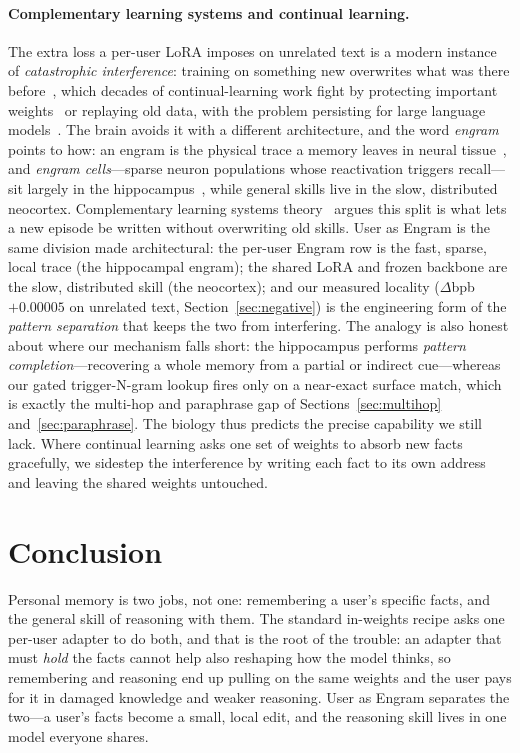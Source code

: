 \documentclass[11pt]{article}
\begin{document}
\paragraph{Complementary learning systems and continual learning.}
The extra loss a per-user LoRA imposes on unrelated text is a modern
instance of \emph{catastrophic interference}: training on
something new overwrites what was there
before~\citep{mccloskey1989catastrophic}, which decades of
continual-learning work fight by protecting important
weights~\citep{kirkpatrick2017ewc} or replaying old data, with
the problem persisting for large language
models~\citep{shi2024continual}. The brain avoids it with a
different architecture, and the word \emph{engram} points to how:
an engram is the physical trace a memory leaves in neural
tissue~\citep{semon1921mneme}, and \emph{engram cells}---sparse
neuron populations whose reactivation triggers recall---sit
largely in the hippocampus~\citep{tonegawa2015engram}, while
general skills live in the slow, distributed neocortex.
Complementary learning systems
theory~\citep{mcclelland1995cls,kumaran2016cls} argues this split
is what lets a new episode be written without overwriting old
skills. User as Engram is the same division made architectural:
the per-user Engram row is the fast, sparse, local trace (the
hippocampal engram); the shared LoRA and frozen backbone are the
slow, distributed skill (the neocortex); and our measured locality
($\Delta$bpb $+0.00005$ on unrelated text,
Section~\ref{sec:negative}) is the engineering form of the
\emph{pattern separation} that keeps the two from interfering. The
analogy is also honest about where our mechanism falls short: the
hippocampus performs \emph{pattern completion}---recovering a whole
memory from a partial or indirect cue---whereas our gated
trigger-N-gram lookup fires only on a near-exact surface match, which
is exactly the multi-hop and paraphrase gap of
Sections~\ref{sec:multihop} and~\ref{sec:paraphrase}. The biology
thus predicts the precise capability we still lack. Where
continual learning asks one set of weights to absorb new facts
gracefully, we sidestep the interference by writing each fact to
its own address and leaving the shared weights untouched.

\section{Conclusion}
\label{sec:conclusion}

Personal memory is two jobs, not one: remembering a
user's specific facts, and the general skill of reasoning with
them. The standard in-weights recipe asks one per-user adapter to
do both, and that is the root of the trouble: an adapter that must
\emph{hold} the facts cannot help also reshaping how the model
thinks, so remembering and reasoning end up pulling on the same
weights and the user pays for it in damaged knowledge and weaker
reasoning. User as Engram separates the two---a user's facts
become a small, local edit, and the reasoning skill lives in one
model everyone shares.
\end{document}
